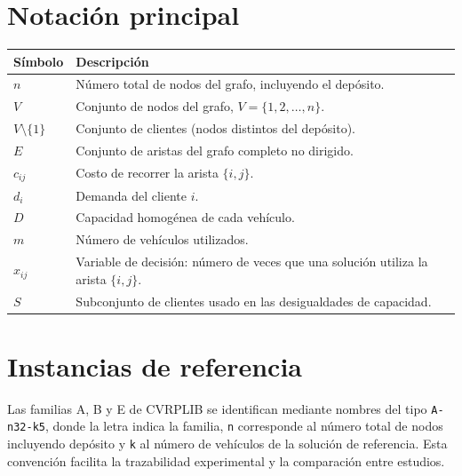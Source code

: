 \section{Notación principal}
\label{apx:notacion}

\begin{longtable}{P{3cm}P{11cm}}
\toprule
\textbf{Símbolo} & \textbf{Descripción} \\
\midrule
$n$ & Número total de nodos del grafo, incluyendo el depósito. \\
$V$ & Conjunto de nodos del grafo, $V = \{1, 2, \dots, n\}$. \\
$V \setminus \{1\}$ & Conjunto de clientes (nodos distintos del depósito). \\
$E$ & Conjunto de aristas del grafo completo no dirigido. \\
$c_{ij}$ & Costo de recorrer la arista $\{i,j\}$. \\
$d_i$ & Demanda del cliente $i$. \\
$D$ & Capacidad homogénea de cada vehículo. \\
$m$ & Número de vehículos utilizados. \\
$x_{ij}$ & Variable de decisión: número de veces que una solución utiliza la arista $\{i,j\}$. \\
$S$ & Subconjunto de clientes usado en las desigualdades de capacidad. \\
\bottomrule
\end{longtable}

\section{Instancias de referencia}
\label{apx:instancias}

Las familias A, B y E de CVRPLIB se identifican mediante nombres del tipo
\texttt{A-n32-k5}, donde la letra indica la familia, \texttt{n} corresponde al número
total de nodos incluyendo depósito y \texttt{k} al número de vehículos de la solución
de referencia. Esta convención facilita la trazabilidad experimental y la comparación
entre estudios.